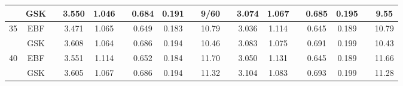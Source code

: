 \begin{landscape}
\begin{table}[htbp]
\begin{tabular}{cc c cc c cc c c c cc c cc c c}
         & GSK && 3.550 & 1.046 && 0.684 & 0.191 && 9/60 && 3.074 & 1.067 && 0.685 & 0.195 && 9.55\\
  \midrule
  35 & EBF && 3.471 & 1.065 && 0.649 & 0.183 && 10.79 && 3.036 & 1.114 && 0.645 & 0.189 && 10.79\\
         & GSK && 3.608 & 1.064 && 0.686 & 0.194 && 10.46 && 3.083 & 1.075 && 0.691 & 0.199 && 10.43\\
  \midrule
  40 & EBF && 3.551 & 1.114 && 0.652 & 0.184 && 11.70 && 3.050 & 1.131 && 0.645 & 0.189 && 11.66\\
         & GSK && 3.605 & 1.067 && 0.686 & 0.194 && 11.32 && 3.104 & 1.083 && 0.693 & 0.199 && 11.28\\
  \bottomrule
  \end{tabular}
\end{table}
\end{landscape}



